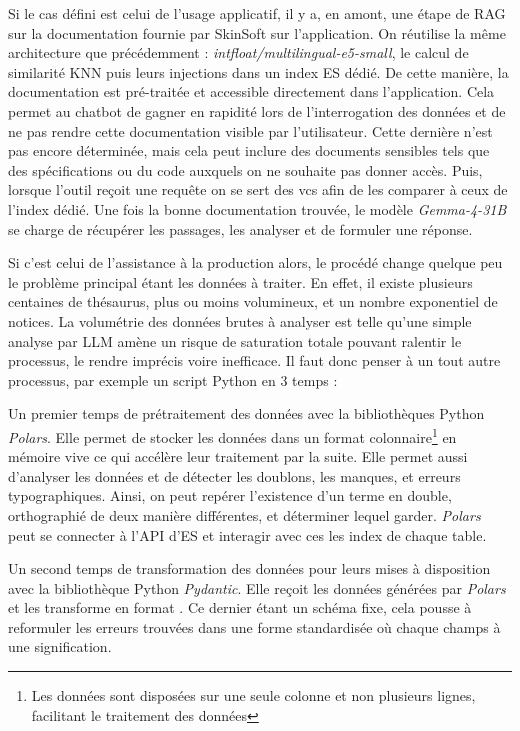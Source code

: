 Si le cas défini est celui de l'usage applicatif, il y a, en amont, une étape de \gls{RAG} sur la documentation fournie par SkinSoft sur l'application. On réutilise la même architecture que précédemment : \textit{intfloat/multilingual-e5-small}, le calcul de similarité KNN puis leurs injections dans un index \gls{ES} dédié. De cette manière, la documentation est pré-traitée et accessible directement dans l'application. Cela permet au \gls{chatbot} de gagner en rapidité lors de l'interrogation des données et de ne pas rendre cette documentation visible par l'utilisateur. Cette dernière n'est pas encore déterminée, mais cela peut inclure des documents sensibles tels que des spécifications ou du code auxquels on ne souhaite pas donner accès.
Puis, lorsque l'outil reçoit une requête on se sert des \gls{vcs} afin de les comparer à ceux de l'index dédié. Une fois la bonne documentation trouvée, le modèle \textit{Gemma-4-31B} se charge de récupérer les passages, les analyser et de formuler une réponse.\newline

Si c'est celui de l'assistance à la production alors, le procédé change quelque peu le problème principal étant les données à traiter. En effet, il existe plusieurs centaines de thésaurus, plus ou moins volumineux, et un nombre exponentiel de notices. La volumétrie des données brutes à analyser est telle qu'une simple analyse par \gls{LLM} amène un risque de saturation totale pouvant ralentir le processus, le rendre imprécis voire inefficace. Il faut donc penser à un tout autre processus, par exemple un script Python en 3 temps :\newline

Un premier temps de prétraitement des données avec la bibliothèques Python \textit{Polars}. Elle permet de stocker les données dans un format colonnaire\footnote{Les données sont disposées sur une seule colonne et non plusieurs lignes, facilitant le traitement des données} en mémoire vive ce qui accélère leur traitement par la suite. Elle permet aussi d'analyser les données et de détecter les doublons, les manques, et erreurs typographiques. Ainsi, on peut repérer l'existence d'un terme en double, orthographié de deux manière différentes, et déterminer lequel garder. \textit{Polars} peut se connecter à l'API d'\gls{ES} et interagir avec ces les index de chaque \gls{table}.\newline
	
Un second temps de transformation des données pour leurs mises à disposition avec la bibliothèque Python \textit{Pydantic}. Elle reçoit les données générées par \textit{Polars} et les transforme en format \J. Ce dernier étant un schéma fixe, cela pousse à reformuler les erreurs trouvées dans une forme standardisée où chaque champs à une signification. 
	
